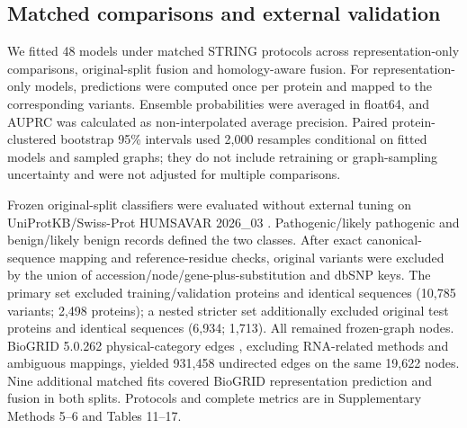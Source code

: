 \documentclass[conference]{IEEEtran}
\begin{document}
\subsection{Matched comparisons and external validation}

We fitted 48 models under matched STRING protocols across representation-only comparisons, original-split fusion and homology-aware fusion. For representation-only models, predictions were computed once per protein and mapped to the corresponding variants. Ensemble probabilities were averaged in float64, and AUPRC was calculated as non-interpolated average precision. Paired protein-clustered bootstrap 95\% intervals used 2,000 resamples conditional on fitted models and sampled graphs; they do not include retraining or graph-sampling uncertainty and were not adjusted for multiple comparisons.

Frozen original-split classifiers were evaluated without external tuning on UniProtKB/\allowbreak{}Swiss-Prot HUMSAVAR 2026\_03 \cite{UniProt2025}. Pathogenic/likely pathogenic and benign/likely benign records defined the two classes. After exact canonical-sequence mapping and reference-residue checks, original variants were excluded by the union of accession/node/gene-plus-substitution and dbSNP keys. The primary set excluded training/validation proteins and identical sequences (10,785 variants; 2,498 proteins); a nested stricter set additionally excluded original test proteins and identical sequences (6,934; 1,713). All remained frozen-graph nodes. BioGRID 5.0.262 physical-category edges \cite{Stark2006BioGRID}, excluding RNA-related methods and ambiguous mappings, yielded 931,458 undirected edges on the same 19,622 nodes. Nine additional matched fits covered BioGRID representation prediction and fusion in both splits. Protocols and complete metrics are in Supplementary Methods 5--6 and Tables 11--17.
\end{document}
